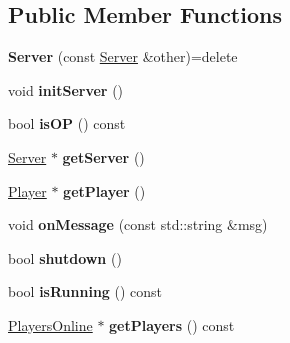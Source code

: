 \subsection*{Public Member Functions}
\begin{DoxyCompactItemize}
\item 
\hypertarget{class_server_aca4a9834f8bf136619d3c4cdb1db4e1e}{{\bfseries Server} (const \hyperlink{class_server}{Server} \&other)=delete}\label{class_server_aca4a9834f8bf136619d3c4cdb1db4e1e}

\item 
\hypertarget{class_server_a7bc5c00fa3ae1ddfae71274ee7d025ea}{void {\bfseries init\-Server} ()}\label{class_server_a7bc5c00fa3ae1ddfae71274ee7d025ea}

\item 
\hypertarget{class_server_a7b6439f1e85af364215c544d675ea972}{bool {\bfseries is\-O\-P} () const }\label{class_server_a7b6439f1e85af364215c544d675ea972}

\item 
\hypertarget{class_server_a8af940772beedcc0b1243adf3f5aec0c}{\hyperlink{class_server}{Server} $\ast$ {\bfseries get\-Server} ()}\label{class_server_a8af940772beedcc0b1243adf3f5aec0c}

\item 
\hypertarget{class_server_a35be365123751e27d6c52ad3962b9b1e}{\hyperlink{struct_player}{Player} $\ast$ {\bfseries get\-Player} ()}\label{class_server_a35be365123751e27d6c52ad3962b9b1e}

\item 
\hypertarget{class_server_a37a56fedea3137e9b8080ee0e86e8278}{void {\bfseries on\-Message} (const std\-::string \&msg)}\label{class_server_a37a56fedea3137e9b8080ee0e86e8278}

\item 
\hypertarget{class_server_a58c74bafaaf20b24e9243c7cf5fdfd16}{bool {\bfseries shutdown} ()}\label{class_server_a58c74bafaaf20b24e9243c7cf5fdfd16}

\item 
\hypertarget{class_server_ab8c22a0d6809e9aa84bebce478ba7bc5}{bool {\bfseries is\-Running} () const }\label{class_server_ab8c22a0d6809e9aa84bebce478ba7bc5}

\item 
\hypertarget{class_server_ab103cde2777536fa63b2746b6e0a98d4}{\hyperlink{class_players_online}{Players\-Online} $\ast$ {\bfseries get\-Players} () const }\label{class_server_ab103cde2777536fa63b2746b6e0a98d4}

\end{DoxyCompactItemize}


